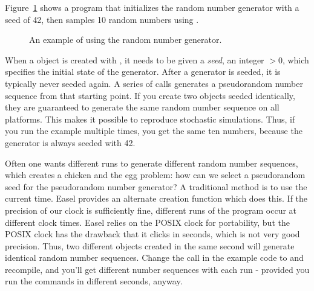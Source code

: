 Figure~\ref{fig:random_example} shows a program that initializes the
random number generator with a seed of 42, then samples 10 random
numbers using .

\begin{figure}

\caption{An example of using the random number generator.}
\label{fig:random_example}
\end{figure}

When a  object is created with
, it needs to be given a \emph{seed},
an integer $> 0$, which specifies the initial state of the
generator. After a generator is seeded, it is typically never seeded
again. A series of  calls generates a
pseudorandom number sequence from that starting point. If you create
two  objects seeded identically, they are
guaranteed to generate the same random number sequence on all
platforms. This makes it possible to reproduce stochastic simulations.
Thus, if you run the example multiple times, you get the same ten
numbers, because the generator is always seeded with 42.

Often one wants different runs to generate different random number
sequences, which creates a chicken and the egg problem: how can we
select a pseudorandom seed for the pseudorandom number generator? A
traditional method is to use the current time. Easel provides an
alternate creation function
 which does this. If the
precision of our clock is sufficiently fine, different runs of the
program occur at different clock times. Easel relies on the POSIX
clock for portability, but the POSIX clock has the drawback that it
clicks in seconds, which is not very good precision. Thus, two
different  objects created in the same second
will generate identical random number sequences. Change the
 call in the example code to
 and recompile, and you'll
get different number sequences with each run - provided you run the
commands in different seconds, anyway. 

